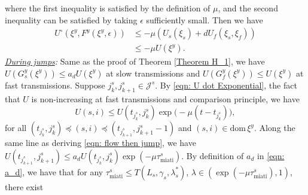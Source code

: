 where the first inequality is satisfied by the definition of $\mu$, and the second inequality can be satisfied by taking $\epsilon$ sufficiently small.
%
Then we have 
\begin{equation}
    \begin{aligned}
        U^\circ(\xi^y, F^y(\xi^y, \epsilon)) &\leq -\mu (U_s(\xi_s) + d U_f(\xi_s,\xi_f)) \\
        & \leq - \mu U(\xi^y).
        \label{eqn: U dot Exponential}
    \end{aligned}
\end{equation}
%
\noindent\emph{\underline{During jumps}:} 
Same as the proof of Theorem \ref{Theorem H_1}, we have $U(G_s^y(\xi^y)) \leq a_d U(\xi^y)$ at slow transmissions and $U(G_f^y(\xi^y)) \leq U(\xi^y)$ at fast transmissions.
%
Suppose $j_k^s, j_{k+1}^s \in \mathcal{J}^s$.
By \eqref{eqn: U dot Exponential}, the fact that $U$ is non-increasing at fast transmissions and comparison principle, we have
\begin{equation}
    U(s,i) \leq U(t_{j_k^s}, j_k^s) \exp \! \big(-\mu(t-t_{j_k^s}) \big) \label{eqn: Exponential U flow - Exponential}, 
\end{equation}
for all $(t_{j_k^s}, j_k^s) \preceq (s,i) \preceq (t_{j_{k+1}^s}, j_{k+1}^s - 1)$ and $(s,i)\in \text{dom}\,\xi^y$.
%
%
Along the same line as deriving \eqref{eqn: flow then jump}, we have $U(t_{j_{k+1}^s}, j^s_{k+1}) \leq a_d U(t_{j_k^s}, j_k^s) \exp (-\mu\tau_{\text{miati}}^s )$.
By definition of $a_d$ in \eqref{eqn: a_d}, we have that for any $\tau_{\text{miati}}^{s} \leq T(L_s, \gamma_s, \lambda_s^*)$, $\lambda \in (\exp (-\mu\tau_{\text{miati}}^s ), 1)$, there exist 
